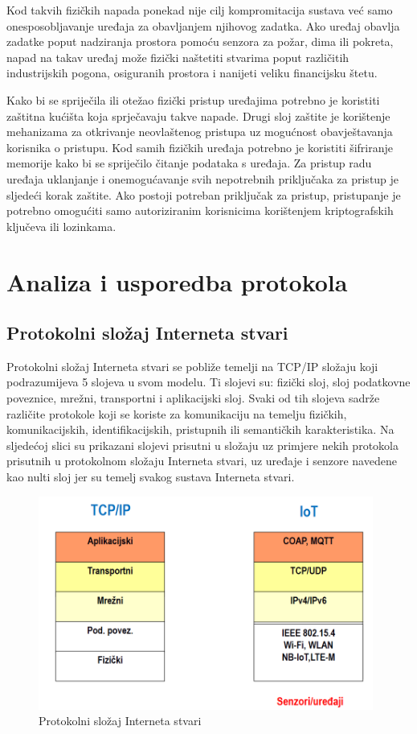 \documentclass[times, utf8, diplomski]{fer}
\begin{document}
Kod takvih fizičkih napada ponekad nije cilj kompromitacija sustava već samo onesposobljavanje uređaja za obavljanjem njihovog zadatka. Ako uređaj obavlja zadatke poput nadziranja prostora pomoću senzora za požar, dima ili pokreta, napad na takav uređaj može fizički naštetiti stvarima poput različitih industrijskih pogona, osiguranih prostora i nanijeti veliku financijsku štetu.

Kako bi se spriječila ili otežao fizički pristup uređajima potrebno je koristiti zaštitna kućišta koja sprječavaju takve napade. Drugi sloj zaštite je korištenje mehanizama za otkrivanje neovlaštenog pristupa uz mogućnost obavještavanja korisnika o pristupu. Kod samih fizičkih uređaja potrebno je koristiti šifriranje memorije kako bi se spriječilo čitanje podataka s uređaja. Za pristup radu uređaja uklanjanje i onemogućavanje svih nepotrebnih priključaka za pristup je sljedeći korak zaštite. Ako postoji potreban priključak za pristup, pristupanje je potrebno omogućiti samo autoriziranim korisnicima korištenjem kriptografskih ključeva ili lozinkama.

\chapter{Analiza i usporedba protokola}

\section{Protokolni složaj Interneta stvari}
Protokolni složaj Interneta stvari se pobliže temelji na TCP/IP složaju koji podrazumijeva 5 slojeva u svom modelu. Ti slojevi su: fizički sloj, sloj podatkovne poveznice, mrežni, transportni i aplikacijski sloj. Svaki od tih slojeva sadrže različite protokole koji se koriste za komunikaciju na temelju fizičkih, komunikacijskih, identifikacijskih, pristupnih ili semantičkih karakteristika. Na sljedećoj slici su prikazani slojevi prisutni u složaju uz primjere nekih protokola prisutnih u protokolnom složaju Interneta stvari, uz uređaje i senzore navedene kao nulti sloj jer su temelj svakog sustava Interneta stvari. 
\begin{figure}[htb]
    \centering
    \includegraphics[width=11cm]{images/iot-stack.png}
    \caption{Protokolni složaj Interneta stvari\citep{InternetStvari}}
    \label{fig:iotstack}
\end{figure}
\end{document}
